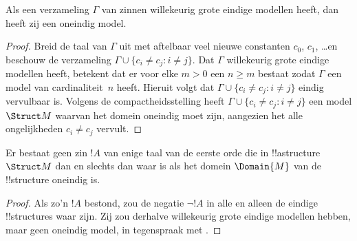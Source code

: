 \documentclass[../../../include/open-logic-section]{subfiles}
\begin{document}

\begin{thm}
 Als een verzameling $\Gamma$ van zinnen willekeurig
grote eindige modellen heeft, dan heeft zij een oneindig model.
\end{thm}

\begin{proof}
Breid de taal van $\Gamma$ uit met aftelbaar veel nieuwe constanten
$c_0$, $c_1$, \dots en beschouw de verzameling $\Gamma \cup \{c_i \neq c_j :
i \neq j\}$. Dat $\Gamma$ willekeurig grote eindige modellen heeft,
betekent dat er voor elke $m >0$ een $n\ge m$ bestaat zodat $\Gamma$ een
model van cardinaliteit~$n$ heeft. Hieruit volgt dat $\Gamma \cup \{c_i \neq
c_j : i \neq j\}$ eindig vervulbaar is. Volgens de compactheidsstelling
heeft $\Gamma \cup \{c_i \neq c_j : i \neq j\}$ een model $\Struct M$
waarvan het domein oneindig moet zijn, aangezien het alle ongelijkheden
$c_i \neq c_j$ vervult.
\end{proof}

\begin{prop}
Er bestaat geen zin $!A$ van enige taal van de eerste orde die in
!!a{structure}~$\Struct M$ dan en slechts dan waar is als het domein
$\Domain{M}$ van de !!{structure} oneindig is.
\end{prop}

\begin{proof}
Als zo'n $!A$ bestond, zou de negatie $\lnot !A$ in alle en alleen de
eindige !!{structure}s waar zijn. Zij zou derhalve willekeurig grote
eindige modellen hebben, maar geen oneindig model, in tegenspraak met
.
\end{proof}
\end{document}
